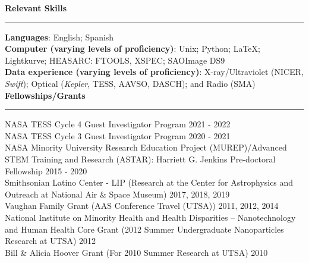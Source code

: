 \documentclass[letter,11pt]{article}
\begin{document}

\noindent
{\bf Relevant Skills} \\
\vspace{-10mm}
\begin{center}
\rule{\textwidth}{0.2mm}
\end{center}
\vspace{-3mm}
\noindent
\textbf{Languages}: English; Spanish\\
\textbf{Computer (varying levels of proficiency)}: Unix; Python; LaTeX; Lightkurve; HEASARC: FTOOLS, XSPEC; SAOImage DS9 \\
\textbf{Data experience (varying levels of proficiency)}: X-ray/Ultraviolet (NICER, {\it Swift}); Optical ({\it Kepler}, TESS, AAVSO, DASCH); and Radio (SMA) \\

\noindent
{\bf Fellowships/Grants} \\
\vspace{-10mm}
\begin{center}
\rule{\textwidth}{0.2mm}
\end{center}
\vspace{-3mm}
\noindent
NASA TESS Cycle 4 Guest Investigator Program \hfill 2021 - 2022 \\
NASA TESS Cycle 3 Guest Investigator Program \hfill 2020 - 2021 \\
NASA Minority University Research Education Project (MUREP)/Advanced STEM Training and Research (ASTAR): Harriett G. Jenkins Pre-doctoral Fellowship \hfill 2015 - 2020 \\
Smithsonian Latino Center - LIP (Research at the Center for Astrophysics and Outreach at National Air \& Space Museum) \hfill 2017, 2018, 2019 \\
Vaughan Family Grant (AAS Conference Travel (UTSA)) \hfill 2011, 2012, 2014 \\
National Institute on Minority Health and Health Disparities – Nanotechnology and Human Health Core Grant (2012 Summer Undergraduate Nanoparticles Research at UTSA) \hfill 2012 \\
Bill \& Alicia Hoover Grant (For 2010 Summer Research at UTSA) \hfill 2010 \\
\end{document}
